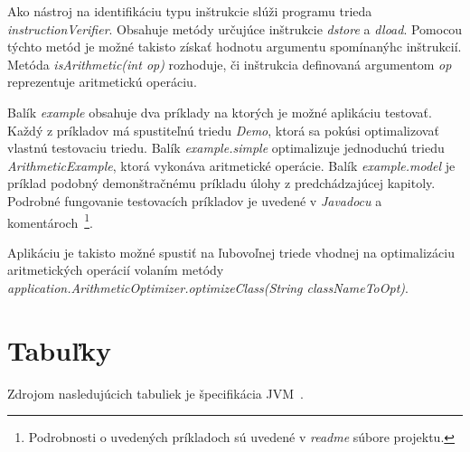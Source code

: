 \documentclass[11pt,final,oneside]{fithesis}
\begin{document}
Ako nástroj na identifikáciu typu inštrukcie slúži programu trieda \textit{instructionVerifier}. Obsahuje metódy určujúce inštrukcie \textit{dstore} a \textit{dload}. Pomocou týchto metód je možné takisto získať hodnotu argumentu spomínanýhc inštrukcií. Metóda \textit{isArithmetic(int op)} rozhoduje, či inštrukcia definovaná argumentom \textit{op} reprezentuje aritmetickú operáciu.

Balík \textit{example} obsahuje dva príklady na ktorých je možné aplikáciu testovať. Každý z príkladov má spustiteľnú triedu \textit{Demo}, ktorá sa pokúsi optimalizovať vlastnú testovaciu triedu. Balík \textit{example.simple} optimalizuje jednoduchú triedu \textit{ArithmeticExample}, ktorá vykonáva aritmetické operácie. Balík \textit{example.model} je príklad podobný demonštračnému príkladu úlohy z predchádzajúcej kapitoly. Podrobné fungovanie testovacích príkladov je uvedené v \textit{Javadocu} a komentároch~\footnote{Podrobnosti o uvedených príkladoch sú uvedené v \textit{readme} súbore projektu.}.

Aplikáciu je takisto možné spustiť na ľubovoľnej triede vhodnej na optimalizáciu aritmetických operácií volaním metódy \textit{application.ArithmeticOptimizer.optimizeClass(String classNameToOpt)}.

\nocite{RedHat:Javassist}
\clearpage
{} 
 
 

\appendix

\chapter{Tabuľky}
Zdrojom nasledujúcich tabuliek je špecifikácia
JVM~\cite{Lindholm:2013:JVM:2462629}.
\end{document}
